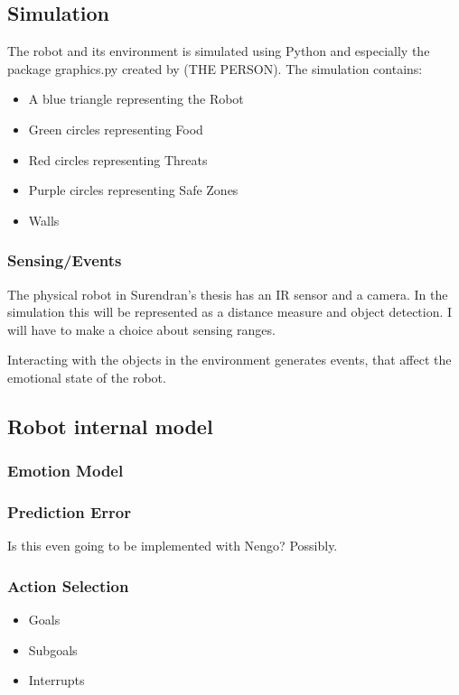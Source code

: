 \documentclass[12pt]{article}
\begin{document}
\subsection{Simulation}
The robot and its environment is simulated using Python and especially the package graphics.py created by (THE PERSON). The simulation contains: 
\begin{itemize}
\item A blue triangle representing the Robot
\item Green circles representing Food
\item Red circles representing Threats
\item Purple circles representing Safe Zones
\item Walls
\end{itemize}

\subsubsection{Sensing/Events}
The physical robot in Surendran's thesis has an IR sensor and a camera. In the simulation this will be represented as a distance measure and object detection. I will have to make a choice about sensing ranges. 


Interacting with the objects in the environment generates events, that affect the emotional state of the robot.  
\subsection{Robot internal model}


\subsubsection{Emotion Model}

\subsubsection{Prediction Error}
Is this even going to be implemented with Nengo? Possibly. 

\subsubsection{Action Selection}
\begin{itemize}
	\item Goals
	\item Subgoals
	\item Interrupts
\end{itemize}
\end{document}
